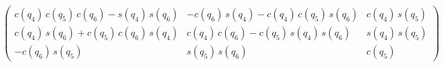 \documentclass[11pt, a4paper]{article}
\begin{document}
\begin{matlabsymbolicoutput}
$\displaystyle \begin{pmatrix}
c\left(q_4 \right)\,c\left(q_5 \right)\,c\left(q_6 \right)-s\left(q_4 \right)\,s\left(q_6 \right) & -c\left(q_6 \right)\,s\left(q_4 \right)-c\left(q_4 \right)\,c\left(q_5 \right)\,s\left(q_6 \right) & c\left(q_4 \right)\,s\left(q_5 \right)\\
c\left(q_4 \right)\,s\left(q_6 \right)+c\left(q_5 \right)\,c\left(q_6 \right)\,s\left(q_4 \right) & c\left(q_4 \right)\,c\left(q_6 \right)-c\left(q_5 \right)\,s\left(q_4 \right)\,s\left(q_6 \right) & s\left(q_4 \right)\,s\left(q_5 \right)\\
-c\left(q_6 \right)\,s\left(q_5 \right) & s\left(q_5 \right)\,s\left(q_6 \right) & c\left(q_5 \right)
\end{pmatrix}$
\end{matlabsymbolicoutput}
\end{document}
